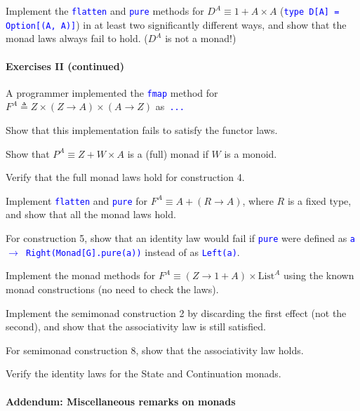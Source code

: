Implement the \texttt{\textcolor{blue}{\footnotesize{}flatten}} and
\texttt{\textcolor{blue}{\footnotesize{}pure}} methods for $D^{A}\equiv1+A\times A$
(\texttt{\textcolor{blue}{\footnotesize{}type D{[}A{]} = Option{[}(A,
A){]}}}) in at least two significantly different ways, and show that
the monad laws always fail to hold. ($D^{A}$ is not a monad!)


\paragraph{Exercises II (continued)}

A programmer implemented the \texttt{\textcolor{blue}{\footnotesize{}fmap}}
method for {\footnotesize{}$F^{A}\triangleq Z\times\left(Z\rightarrow A\right)\times\left(A\rightarrow Z\right)$
}as\texttt{\textcolor{blue}{\footnotesize{} ...}}{\footnotesize\par}

Show that this implementation fails to satisfy the functor laws.

Show that $P^{A}\equiv Z+W\times A$ is a (full) monad if $W$ is
a monoid.

Verify that the full monad laws hold for construction 4.

Implement \texttt{\textcolor{blue}{\footnotesize{}flatten}} and \texttt{\textcolor{blue}{\footnotesize{}pure}}
for $F^{A}\equiv A+\left(R\rightarrow A\right)$, where $R$ is a
fixed type, and show that all the monad laws hold.

For construction 5, show that an identity law would fail if \texttt{\textcolor{blue}{\footnotesize{}pure}}
were defined as \texttt{\textcolor{blue}{\footnotesize{}a $\rightarrow$
Right(Monad{[}G{]}.pure(a))}} instead of as \texttt{\textcolor{blue}{\footnotesize{}Left(a)}}.

Implement the monad methods for $F^{A}\equiv\left(Z\rightarrow1+A\right)\times\text{List}^{A}$
using the known monad constructions (no need to check the laws).

Implement the semimonad construction 2 by discarding the first effect
(not the second), and show that the associativity law is still satisfied.

For semimonad construction 8, show that the associativity law holds.

Verify the identity laws for the State and Continuation monads.


\paragraph{Addendum: Miscellaneous remarks on monads}

